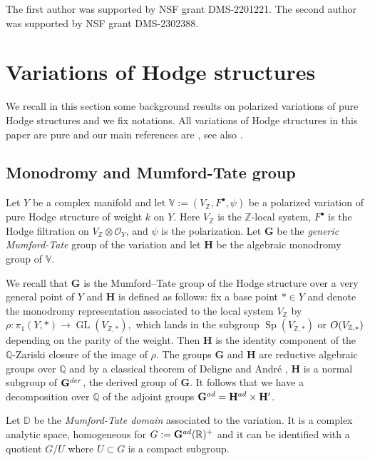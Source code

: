 \documentclass[10pt,letterpaper,english,reqno]{amsart}
\numberwithin{equation}{subsection}
\newcommand\cO{{\mathcal O}}
\newcommand\bD{{\mathbb D}}
\newcommand\Q{{\mathbb Q}}
\newcommand\R{{\mathbb R}}
\newcommand\bV{{\mathbb V}}
\newcommand\Z{{\mathbb Z}}
\newcommand\bfG{{\mathbf G}}
\newcommand\bfH{{\mathbf H}}
\DeclareMathOperator{\GL}{GL}
\DeclareMathOperator{\Sp}{Sp}
\theoremstyle{definition}
\begin{document}
The first author was supported by NSF grant DMS-2201221. The second author was supported by NSF grant DMS-2302388.

\section{Variations of Hodge structures}\label{hodge-theory}

We recall in this section some background results on 
polarized variations of pure Hodge structures and we fix 
notations. All variations of Hodge structures in this paper are pure and our main references are 
\cite{green-griffiths-kerr,klingler-survey}, see also \cite{griffithsI,griffithsIII}. 

\subsection{Monodromy and Mumford-Tate group}
Let $Y$ be a complex manifold and let 
$\bV:=(V_\Z,F^\bullet,\psi)$ be a polarized variation 
of pure Hodge structure of weight $k$ on $Y$. Here $V_\Z$
is the $\Z$-local system, $F^\bullet$ is the Hodge filtration
on $V_\Z\otimes \cO_Y$, and $\psi$ is the polarization.
Let $\bfG$ be 
the \emph{generic Mumford-Tate} group of the variation 
and let $\bfH$ be the algebraic monodromy group of $\bV$. 

We recall that $\bfG$ is the Mumford--Tate group of the Hodge
structure over a very general point of $Y$ and 
$\bfH$ is defined as follows: 
fix a base point $*\in Y$ and denote the monodromy 
representation associated to the local system $V_\Z$ by 
$\rho\colon \pi_1(Y,*)\to \GL(V_{\Z,*}),$ which lands in 
the subgroup $\Sp(V_{\Z,*})$ or ${\rm O}(V_{\Z,*})$ 
depending on the parity of the weight. Then $\bfH$ is the 
identity component of the $\Q$-Zariski closure of the image 
of $\rho$. The groups $\bfG$ and $\bfH$ are reductive 
algebraic groups over $\Q$ and by a classical theorem of 
Deligne \cite[Section 4]{hodge2} and Andr\'e  \cite[Theorem 1]{Andre-Mumford-Tate}, $\bfH$ is a normal subgroup of 
$\bfG^{\rm der}$, the derived group of $\bfG$. It follows 
that we have a decomposition over $\Q$ of the adjoint groups 
$\bfG^{\rm ad}=\bfH^{\rm ad}\times \bfH'$.    

Let $\bD$ be the \emph{Mumford-Tate domain} associated to the 
variation. It is a complex analytic space, homogeneous for 
$G:=\bfG^{\rm ad}(\R)^+$ and it can be identified with a 
quotient $G/U$ where $U\subset G$ is a compact 
subgroup. 
\end{document}

